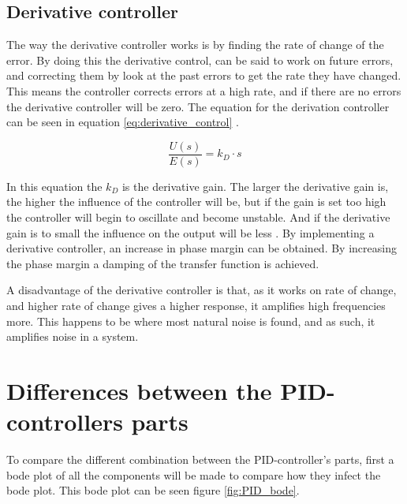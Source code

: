 \subsection*{Derivative controller}
The way the derivative controller works is by finding the rate of change of the error. By doing this the derivative control, can be said to work on future errors, and correcting them by look at the past errors to get the rate they have changed. This means the controller corrects errors at a high rate, and if there are no errors the derivative controller will be zero. The equation for the derivation controller can be seen in equation \ref{eq:derivative_control} \cite{digital_control}.

\begin{equation}\label{eq:derivative_control}
\frac{U(s)}{E(s)}=k_D \cdot s
\end{equation}

In this equation the $k_D$ is the derivative gain. The larger the derivative gain is, the higher the influence of the controller will be, but if the gain is set too high the controller will begin to oscillate and become unstable. And if the derivative gain is to small the influence on the output will be less \cite{digital_control}. By implementing a derivative controller, an increase in phase margin can be obtained. By increasing the phase margin a damping of the transfer function is achieved.

A disadvantage of the derivative controller is that, as it works on rate of change, and higher rate of change gives a higher response, it amplifies high frequencies more. This happens to be where most natural noise is found, and as such, it amplifies noise in a system.

\section{Differences between the PID-controllers parts}\label{s:different_pid}
To compare the different combination between the PID-controller's parts, first a bode plot of all the components will be made to compare how they infect the bode plot. This bode plot can be seen figure \ref{fig:PID_bode}.

